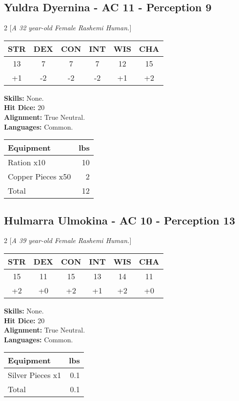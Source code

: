 \subsection*{Yuldra Dyernina - AC 11 - Perception 9}
\begin{multicols}{2}
[\textit{A 32 year-old Female Rashemi Human.}]
\begin{tabular}{cccccc}
 {STR}&
 {DEX}&
 {CON}&
 {INT}&
 {WIS}&
 {CHA}\\
\hline
13 & 7 & 7 & 7 & 12 & 15\\
+1 & -2 & -2 & -2 & +1 & +2
\end{tabular}
\textbf{Skills:} 
None.\\
\textbf{Hit Dice:} 20\\
\textbf{Alignment:} True Neutral.\\
\textbf{Languages:} 
Common.\\

\begin{tabular}{p{} r}
\textbf{Equipment} & lbs\\
\hline

Ration x10 & 10\\

Copper Pieces x50 & 2\\

\hline
Total & 12
\end{tabular}


\end{multicols}


\subsection*{Hulmarra Ulmokina - AC 10 - Perception 13}
\begin{multicols}{2}
[\textit{A 39 year-old Female Rashemi Human.}]
\begin{tabular}{cccccc}
 {STR}&
 {DEX}&
 {CON}&
 {INT}&
 {WIS}&
 {CHA}\\
\hline
15 & 11 & 15 & 13 & 14 & 11\\
+2 & +0 & +2 & +1 & +2 & +0
\end{tabular}
\textbf{Skills:} 
None.\\
\textbf{Hit Dice:} 20\\
\textbf{Alignment:} True Neutral.\\
\textbf{Languages:} 
Common.\\

\begin{tabular}{p{} r}
\textbf{Equipment} & lbs\\
\hline

Silver Pieces x1 & 0.1\\

\hline
Total & 0.1
\end{tabular}


\end{multicols}


